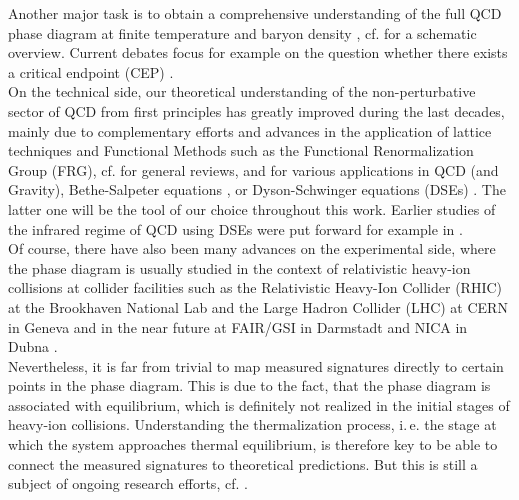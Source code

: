 \hspace{-0.5em}Another major task is to obtain a comprehensive understanding of the full QCD phase diagram at finite temperature and baryon density  \cite{Wink2020, BraunHaasMarhauserPawlowski2009,FuPawlowskiRennecke2019}, cf.  for a schematic overview. Current debates focus for example on the question whether there exists a critical endpoint (CEP) \cite{AokiFodorKatzSzabo2006}. \\
On the technical side, our theoretical understanding of the non-perturbative sector of QCD from first principles has greatly improved during the last decades, mainly due to complementary efforts and advances in the application  of lattice techniques \cite{Philipsen2007, deForcrand2010} and  Functional Methods such as the Functional Renormalization Group (FRG), cf. \cite{Wetterich1992, Pawlowski2005, Dupuis2020} for general reviews, and \cite{NPgaugeLecture} for various applications in QCD (and Gravity), Bethe-Salpeter equations \cite{BetheSalpeter1951}, or Dyson-Schwinger equations (DSEs) \cite{Dyson1949, Schwinger1951}. The latter one will be the tool of our choice throughout this work. Earlier studies of the infrared regime of QCD using DSEs were put forward for example in \cite{Fischer2006,Fischer2019, Maris2003, RobertsWilliams1994}.\\
Of course, there have also been many advances on the experimental side, where the phase diagram is usually studied in the context of relativistic heavy-ion collisions at collider facilities such as the Relativistic Heavy-Ion Collider (RHIC) at the Brookhaven National Lab \cite{RHIC} and the Large Hadron Collider (LHC) at CERN in Geneva \cite{LHC} and in the near future at FAIR/GSI in Darmstadt \cite{FAIR} and NICA in Dubna \cite{NICA}. \\
Nevertheless, it is far from trivial to map measured signatures directly to certain points in the phase diagram. This is due to the fact, that the phase diagram is associated with equilibrium, which is definitely not realized in the initial stages of heavy-ion collisions. Understanding the thermalization process, i.\,e. the stage at which the system approaches thermal equilibrium, is therefore key to be able to connect the measured signatures to theoretical predictions. But this is still a subject of ongoing research efforts, cf. \cite{Blaizot2012, Blaizot2016, Wolschin2020, SchlichtingTeaney2019}.\\
